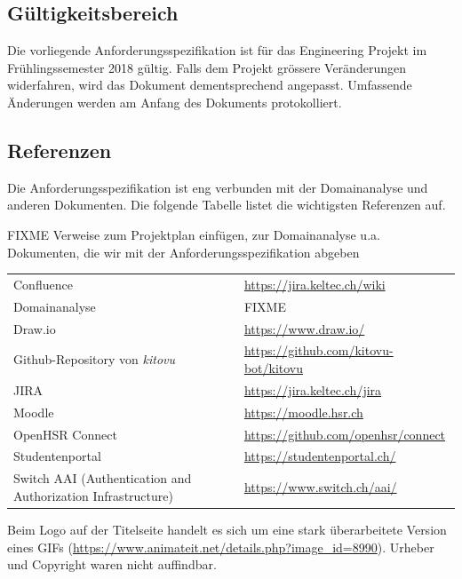 \documentclass[a4paper]{article}
\def\jiraurl{https://jira.keltec.ch/jira}
\def\confluenceurl{https://jira.keltec.ch/wiki}
\begin{document}
\subsection{Gültigkeitsbereich}
Die vorliegende Anforderungsspezifikation ist für das Engineering Projekt im Frühlingssemester 2018 gültig. Falls dem Projekt grössere Veränderungen widerfahren, wird das Dokument dementsprechend angepasst. Umfassende Änderungen werden am Anfang des Dokuments protokolliert.

\subsection{Referenzen}


Die Anforderungsspezifikation ist eng verbunden mit der Domainanalyse und anderen Dokumenten. Die folgende Tabelle listet die wichtigsten Referenzen auf.

FIXME Verweise zum Projektplan einfügen, zur Domainanalyse u.a. Dokumenten, die wir mit der Anforderungsspezifikation abgeben

\begin{tabulary}{\linewidth}{ll}
	Confluence & \url{\confluenceurl} \\
	Domainanalyse & FIXME \\
	Draw.io & \url{https://www.draw.io/} \\
	Github-Repository von \emph{kitovu} & \url{https://github.com/kitovu-bot/kitovu} \\
	JIRA	& \url{\jiraurl} \\
	Moodle & \url{https://moodle.hsr.ch} \\
	OpenHSR Connect & \url{https://github.com/openhsr/connect} \\
	Studentenportal & \url{https://studentenportal.ch/} \\
	Switch AAI (Authentication and Authorization Infrastructure)& \url{https://www.switch.ch/aai/} \\
	
\end{tabulary}

Beim Logo auf der Titelseite handelt es sich um eine stark überarbeitete Version eines GIFs (\url{https://www.animateit.net/details.php?image_id=8990}). Urheber und Copyright waren nicht auffindbar.
\end{document}
